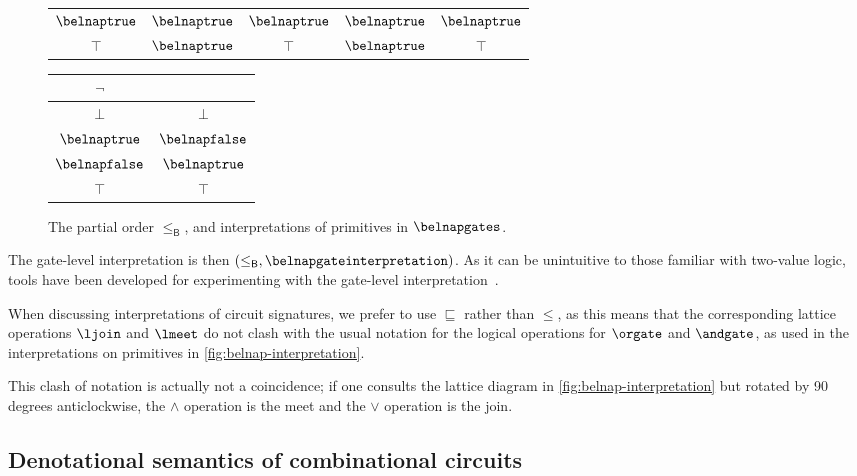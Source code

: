 \documentclass{lmcs}
\begin{document}
\begin{exa}
\begin{figure}
\begin{tabular}{|c|cccc|}
            \(\belnaptrue\)  & \(\belnaptrue\) & \(\belnaptrue\)  & \(\belnaptrue\) & \(\belnaptrue\) \\
            \(\top\)         & \(\belnaptrue\) & \(\top\)         & \(\belnaptrue\) & \(\top\)        \\
            \hline
        \end{tabular}
        \quad
        \begin{tabular}{|c|c|}
            \hline
            \(\neg\)         &                  \\
            \hline
            \(\bot\)         & \(\bot\)         \\
            \(\belnaptrue\)  & \(\belnapfalse\) \\
            \(\belnapfalse\) & \(\belnaptrue\)  \\
            \(\top\)         & \(\top\)         \\
            \hline
        \end{tabular}
        \caption{
            The partial order \(\leq_\mathsf{B}\), and interpretations
            of primitives in \(\belnapgates\).
        }
        \label{fig:belnap-interpretation}
    \end{figure}

    The gate-level interpretation is then \(
    (\leq_\mathsf{B}, \belnapgateinterpretation)
    \).
    As it can be unintuitive to those familiar with two-value logic, tools have
    been developed for experimenting with the gate-level
    interpretation~\cite{kaye2026belnap}.
\end{exa}

\begin{rem}
    When discussing interpretations of circuit signatures, we prefer to use
    \(\sqsubseteq\) rather than \(\leq\), as this means that the corresponding
    lattice operations \(\ljoin\) and \(\lmeet\) do not clash with the usual
    notation for the logical operations for \(\orgate\) and \(\andgate\), as
    used in the interpretations on primitives in
    \autoref{fig:belnap-interpretation}.

    This clash of notation is actually not a coincidence; if one consults the
    lattice diagram in \autoref{fig:belnap-interpretation} but rotated by 90
    degrees anticlockwise, the \(\land\) operation is the meet and the
    \(\lor\) operation is the join.
\end{rem}

\subsection{Denotational semantics of combinational circuits}
\end{document}

